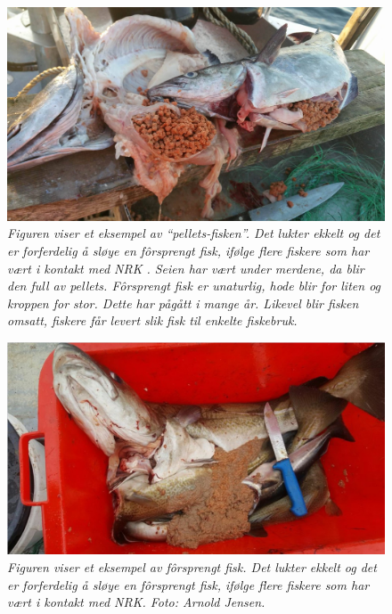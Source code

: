 \begin{figure} 
\begin{center} 
\includegraphics[scale=0.2]{figures/oppdrettfor}
\caption{\small \sl Figuren viser et eksempel av ``pellets-fisken''. Det lukter ekkelt og det er forferdelig å sløye en fôrsprengt fisk, ifølge flere fiskere som har vært i kontakt med NRK \cite{Trana m.fl. 2019}. Seien har vært under merdene, da blir den full av pellets. Fôrsprengt fisk er unaturlig, hode blir for liten og kroppen for stor. Dette har pågått i mange år. Likevel blir fisken omsatt, fiskere får levert slik fisk til enkelte fiskebruk. \cite{Angell og Ekanger 2017} \label{fig:oppdrettfor}} 
\end{center} 
\end{figure} 

\begin{figure}
\begin{center} 
\includegraphics[scale=0.2]{figures/forsprengt}
\caption{\small \sl Figuren viser et eksempel av fôrsprengt fisk. Det lukter ekkelt og det er forferdelig å sløye en fôrsprengt fisk, ifølge flere fiskere som har vært i kontakt med NRK. Foto: Arnold Jensen. \cite{Trana m.fl. 2019} \label{fig:forsprengt}} 
\end{center} 
\end{figure} 


